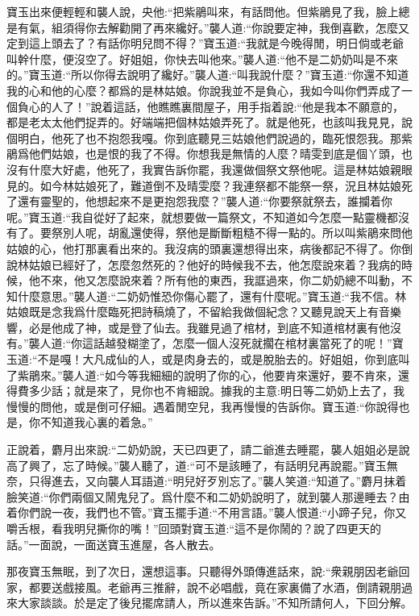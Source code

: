 \begin{parag}
    寶玉出來便輕輕和襲人說，央他:“把紫鵑叫來，有話問他。但紫鵑見了我，臉上總是有氣，組須得你去解勸開了再來纔好。”襲人道:“你說要定神，我倒喜歡，怎麼又定到這上頭去了？有話你明兒問不得？”寶玉道:“我就是今晚得閒，明日倘或老爺叫幹什麼，便沒空了。好姐姐，你快去叫他來。”襲人道:“他不是二奶奶叫是不來的。”寶玉道:“所以你得去說明了纔好。”襲人道:“叫我說什麼？”寶玉道:“你還不知道我的心和他的心麼？都爲的是林姑娘。你說我並不是負心，我如今叫你們弄成了一個負心的人了！”說着這話，他瞧瞧裏間屋子，用手指着說:“他是我本不願意的，都是老太太他們捉弄的。好端端把個林姑娘弄死了。就是他死，也該叫我見見，說個明白，他死了也不抱怨我嘎。你到底聽見三姑娘他們說過的，臨死恨怨我。那紫鵑爲他們姑娘，也是恨的我了不得。你想我是無情的人麼？晴雯到底是個丫頭，也沒有什麼大好處，他死了，我實告訴你罷，我還做個祭文祭他呢。這是林姑娘親眼見的。如今林姑娘死了，難道倒不及晴雯麼？我連祭都不能祭一祭，況且林姑娘死了還有靈聖的，他想起來不是更抱怨我麼？”襲人道:“你要祭就祭去，誰攔着你呢。”寶玉道:“我自從好了起來，就想要做一篇祭文，不知道如今怎麼一點靈機都沒有了。要祭別人呢，胡亂還使得，祭他是斷斷粗糙不得一點的。所以叫紫鵑來問他姑娘的心，他打那裏看出來的。我沒病的頭裏還想得出來，病後都記不得了。你倒說林姑娘已經好了，怎麼忽然死的？他好的時候我不去，他怎麼說來着？我病的時候，他不來，他又怎麼說來着？所有他的東西，我誆過來，你二奶奶總不叫動，不知什麼意思。”襲人道:“二奶奶惟恐你傷心罷了，還有什麼呢。”寶玉道:“我不信。林姑娘既是念我爲什麼臨死把詩稿燒了，不留給我做個紀念？又聽見說天上有音樂響，必是他成了神，或是登了仙去。我雖見過了棺材，到底不知道棺材裏有他沒有。”襲人道:“你這話越發糊塗了，怎麼一個人沒死就擱在棺材裏當死了的呢！”寶玉道:“不是嘎！大凡成仙的人，或是肉身去的，或是脫胎去的。好姐姐，你到底叫了紫鵑來。”襲人道:“如今等我細細的說明了你的心，他要肯來還好，要不肯來，還得費多少話；就是來了，見你也不肯細說。據我的主意:明日等二奶奶上去了，我慢慢的問他，或是倒可仔細。遇着閒空兒，我再慢慢的告訴你。寶玉道:“你說得也是，你不知道我心裏的着急。”
\end{parag}


\begin{parag}
    正說着，麝月出來說:“二奶奶說，天已四更了，請二爺進去睡罷，襲人姐姐必是說高了興了，忘了時候。”襲人聽了，道:“可不是該睡了，有話明兒再說罷。”寶玉無奈，只得進去，又向襲人耳語道:“明兒好歹別忘了。”襲人笑道:“知道了。”麝月抹着臉笑道:“你們兩個又鬧鬼兒了。爲什麼不和二奶奶說明了，就到襲人那邊睡去？由着你們說一夜，我們也不管。”寶玉擺手道:“不用言語。”襲人恨道:“小蹄子兒，你又嚼舌根，看我明兒撕你的嘴！”回頭對寶玉道:“這不是你鬧的？說了四更天的話。”一面說，一面送寶玉進屋，各人散去。
\end{parag}


\begin{parag}
    那夜寶玉無眠，到了次日，還想這事。只聽得外頭傳進話來，說:“衆親朋因老爺回家，都要送戲接風。老爺再三推辭，說不必唱戲，竟在家裏備了水酒，倒請親朋過來大家談談。於是定了後兒擺席請人，所以進來告訴。”不知所請何人，下回分解。
\end{parag}